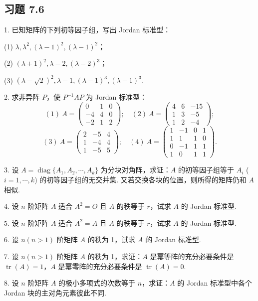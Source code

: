 \documentclass[UTF8, 12pt, fontset=fandol, oneside]{ctexart}
\begin{document}
\subsection*{习题 7.6}

1. 已知矩阵的下列初等因子组，写出 Jordan 标准型：

(1) $\lambda,\lambda^2,(\lambda-1)^2,(\lambda-1)^2$；

(2) $(\lambda+1)^2,\lambda-2,(\lambda-2)^3$；

(3) $(\lambda-\sqrt{2})^2,\lambda-1,(\lambda-1)^3,(\lambda-1)^3$.

2. 求非异阵 $P$，使 $P^{-1}AP$ 为 Jordan 标准型：
\[
(1)\ A=\left(\begin{array}{ccc}
0 & 1 & 0\\
-4 & 4 & 0\\
-2 & 1 & 2
\end{array}\right);\quad
(2)\ A=\left(\begin{array}{ccc}
4 & 6 & -15\\
1 & 3 & -5\\
1 & 2 & -4
\end{array}\right);
\]
\[
(3)\ A=\left(\begin{array}{ccc}
2 & -5 & 4\\
1 & -4 & 4\\
1 & -5 & 5
\end{array}\right);\quad
(4)\ A=\left(\begin{array}{cccc}
1 & -1 & 0 & 1\\
1 & 1 & 1 & 0\\
0 & -1 & 1 & 1\\
1 & 0 & 1 & 1
\end{array}\right).
\]

3. 设 $A=\operatorname{diag}\{A_1,A_2,\cdots,A_k\}$ 为分块对角阵，求证：$A$ 的初等因子组等于 $A_i$ ($i=1,\cdots,k$) 的初等因子组的无交并集. 又若交换各块的位置，则所得的矩阵仍和 $A$ 相似.

4. 设 $n$ 阶矩阵 $A$ 适合 $A^2=O$ 且 $A$ 的秩等于 $r$，试求 $A$ 的 Jordan 标准型.

5. 设 $n$ 阶矩阵 $A$ 适合 $A^2=A$ 且 $A$ 的秩等于 $r$，试求 $A$ 的 Jordan 标准型.

6. 设 $n(n>1)$ 阶矩阵 $A$ 的秩为 1，试求 $A$ 的 Jordan 标准型.

7. 设 $n(n>1)$ 阶矩阵 $A$ 的秩为 1，求证：$A$ 是幂等阵的充分必要条件是 $\operatorname{tr}(A)=1$，$A$ 是幂零阵的充分必要条件是 $\operatorname{tr}(A)=0$.

8. 设 $n$ 阶矩阵 $A$ 的极小多项式的次数等于 $n$，求证：$A$ 的 Jordan 标准型中各个 Jordan 块的主对角元素彼此不同.
\end{document}
